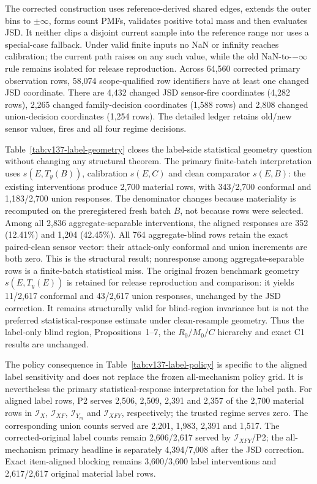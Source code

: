 \documentclass[10pt,journal,compsoc]{IEEEtran}
\newcommand{\IX}{\mathcal I_X}
\newcommand{\IXF}{\mathcal I_{XF}}
\newcommand{\IYm}{\mathcal I_{Y_m}}
\newcommand{\IXFY}{\mathcal I_{XFY}}
\begin{document}
The corrected construction uses reference-derived shared edges, extends the
outer bins to $\pm\infty$, forms count PMFs, validates positive total mass and
then evaluates JSD. It neither clips a disjoint current sample into the
reference range nor uses a special-case fallback. Under valid finite inputs no
NaN or infinity reaches calibration; the current path raises on any such
value, while the old NaN-to-$-\infty$ rule remains isolated for release
reproduction. Across 64,560 corrected primary observation rows, 58,074
scope-qualified row identifiers have at least one changed JSD coordinate.
There are 4,432 changed JSD sensor-fire coordinates (4,282 rows), 2,265 changed
family-decision coordinates (1,588 rows) and 2,808 changed union-decision
coordinates (1,254 rows). The detailed ledger retains old/new sensor values,
fires and all four regime decisions.

Table~\ref{tab:v137-label-geometry} closes the label-side statistical
geometry question without changing any structural theorem. The primary
finite-batch interpretation uses $s(E,T_y(B))$, calibration $s(E,C)$ and clean
comparator $s(E,B)$: the existing interventions produce 2,700 material rows,
with 343/2,700 conformal and 1,183/2,700 union responses. The
denominator changes because materiality is recomputed on the preregistered
fresh batch $B$, not because rows were selected. Among all 2,836
aggregate-separable interventions, the aligned responses are 352 (12.41\%)
and 1,204 (42.45\%). All 764 aggregate-blind rows retain the exact paired-clean
sensor vector: their attack-only conformal and union increments are both zero.
This is the structural result; nonresponse among aggregate-separable rows is a
finite-batch statistical miss. The original frozen benchmark geometry
$s(E,T_y(E))$ is retained for release reproduction and comparison: it yields
11/2,617 conformal and 43/2,617 union responses, unchanged by the JSD
correction. It remains structurally valid for blind-region invariance but is
not the preferred statistical-response estimate under clean-resample geometry.
Thus the label-only blind region, Propositions~1--7, the $R_0/M_0/C$ hierarchy
and exact C1 results are unchanged.

The policy consequence in Table~\ref{tab:v137-label-policy} is specific to the
aligned label sensitivity and does not replace the frozen all-mechanism policy
grid. It is nevertheless the primary statistical-response interpretation for
the label path. For aligned label rows, P2 serves 2,506, 2,509,
2,391 and 2,357 of the 2,700 material rows in $\IX$, $\IXF$, $\IYm$ and
$\IXFY$, respectively; the trusted regime serves zero. The corresponding
union counts served are 2,201, 1,983, 2,391 and 1,517. The corrected-original
label counts remain 2,606/2,617 served by $\IXFY$/P2; the all-mechanism primary
headline is separately 4,394/7,008 after the JSD correction. Exact item-aligned
blocking remains 3,600/3,600 label interventions and 2,617/2,617 original
material label rows.
\end{document}
